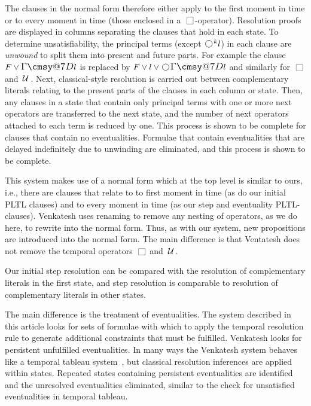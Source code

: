 \documentclass[nohyperref]{acmtrans2f}
\makeatletter
\def\sometime{\mathord{\hbox{\large$\mathchar"0\cmsy@7D$}}}
\newcommand{\always}{\raisebox{-.2ex}{
                           \mbox{\unitlength=0.9ex
                           \begin{picture}(2,2)
                           \linethickness{0.06ex}
                           \put(0,0){\line(1,0){2}}
                           \put(0,2){\line(1,0){2}}
                           \put(0,0){\line(0,1){2}}
                           \put(2,0){\line(0,1){2}}
                           \end{picture}}}
                          \,}
\newcommand{\next}{\!\raisebox{-.2ex}{ %
                        \mbox{\unitlength=0.9ex
                        \begin{picture}(2,2)
                        \linethickness{0.06ex}
                        \put(1,1){\circle{2}} %
                        \end{picture}}}       %
                        \,}
\def\until{\hbox{$\,\cal U \,$}}
\makeatother
\begin{document}
The clauses in the normal form therefore either apply to the first moment
in time or to every moment in time (those enclosed in a
$\always$-operator). Resolution proofs are displayed in columns separating
the clauses that hold in each state. To determine unsatisfiability, the
principal terms 
(except $\next^k l$) in each clause are 
{\em unwound} to split them into present and future parts. For example
the clause $F \lor \sometime l$ is replaced by $F \lor l \lor \next
\sometime l$ and similarly for $\always$ and $\until$. Next, classical-style
resolution is carried out between complementary literals relating to the
present parts of the clauses in each column or state. Then, any clauses in a
state that contain only 
principal terms with one or more next operators are transferred to
the next state, 
and the number of next operators attached to each term is reduced by
one. 
This process is shown to be complete for clauses that contain no eventualities.
Formulae that contain eventualities that are delayed indefinitely due to
unwinding are eliminated, and this process is shown to be complete.

This system makes use of a normal form which at the top level is similar
to ours, i.e., there are clauses that relate to to first moment in time (as
do our initial PLTL clauses) and to every moment in time (as our step and
eventuality PLTL-clauses). Venkatesh uses renaming to remove any
nesting of operators, as we do here, to rewrite into the normal form. Thus,
as with our system, new propositions are introduced into the normal form. The
main difference is that Ventatesh does 
not remove the temporal operators $\always$ and $\until$.

Our initial step resolution can  be compared with the resolution of
complementary literals in the first state, and step resolution is comparable
to resolution of complementary literals in other states.

The main difference is the treatment of eventualities. The system described
in this article looks for sets of formulae with which to apply the temporal
resolution rule to generate additional constraints that must be
fulfilled. Venkatesh looks for persistent unfulfilled eventualities.
In many ways the Venkatesh system behaves like a temporal tableau
system~\cite{Wol83,Gou84}, 
but classical resolution inferences are applied within states. Repeated
states containing persistent eventualities are identified and the
unresolved eventualities eliminated, similar to the check for
unsatisfied eventualities in temporal tableau. 
\end{document}
